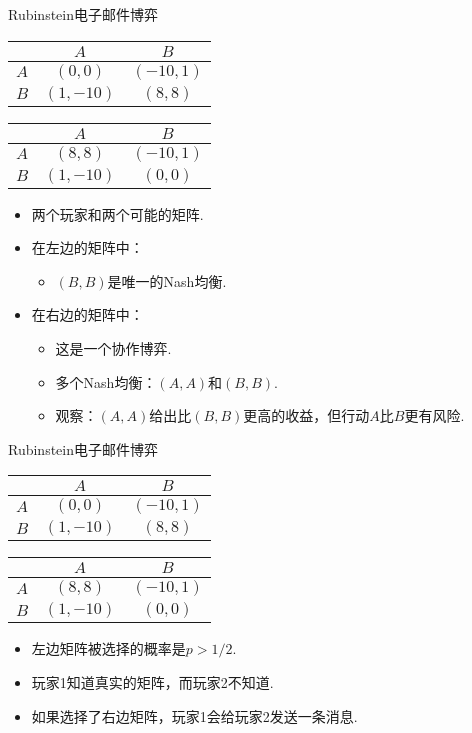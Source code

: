 \begin{frame}{Rubinstein电子邮件博弈}
\begin{table}[]
    \centering
\begin{tabular}{c|cc}
&$A$ & $B$ \\
\hline
$A$ & $(0, 0)$ & $(-10, 1)$ \\
$B$ & $(1, -10)$ & $(8, 8)$ \\
\end{tabular}
\qquad
\begin{tabular}{c|cc}
&$A$ & $B$ \\
\hline
$A$ & $(8, 8)$ & $(-10, 1)$ \\
$B$ & $(1, -10)$ & $(0, 0)$ \\
\end{tabular}
\end{table}
\begin{itemize}
\item 两个玩家和两个可能的矩阵.
\item 在左边的矩阵中：
\begin{itemize}
\item $(B,B)$是唯一的Nash均衡.
\end{itemize}
\item 在右边的矩阵中：
\begin{itemize}
\item 这是一个协作博弈.
\item 多个Nash均衡：$(A,A)$和$(B,B)$.
\item 观察：$(A,A)$给出比$(B,B)$更高的收益，但行动$A$比$B$更有风险.
\end{itemize}
\end{itemize}
\end{frame}

\begin{frame}{Rubinstein电子邮件博弈}
\begin{table}[]
    \centering
\begin{tabular}{c|cc}
&$A$ & $B$ \\
\hline
$A$ & $(0, 0)$ & $(-10, 1)$ \\
$B$ & $(1, -10)$ & $(8, 8)$ \\
\end{tabular}
\qquad
\begin{tabular}{c|cc}
&$A$ & $B$ \\
\hline
$A$ & $(8, 8)$ & $(-10, 1)$ \\
$B$ & $(1, -10)$ & $(0, 0)$ \\
\end{tabular}
\end{table}
\begin{itemize}
\item 左边矩阵被选择的概率是$p>1/2$.
\item 玩家1知道真实的矩阵，而玩家2不知道.
\item 如果选择了右边矩阵，玩家1会给玩家2发送一条消息.
\end{itemize}
\end{frame}


